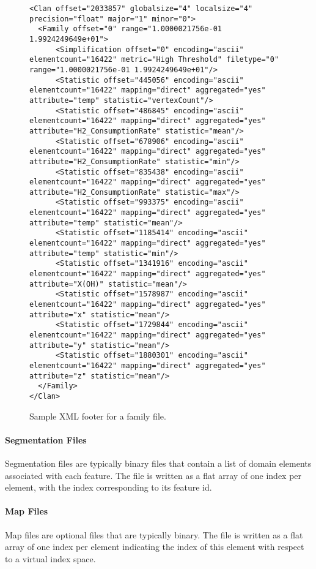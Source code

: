 \begin{figure}[ht]
\tiny{
\begin{verbatim}
<Clan offset="2033857" globalsize="4" localsize="4" precision="float" major="1" minor="0">
  <Family offset="0" range="1.0000021756e-01 1.9924249649e+01">
      <Simplification offset="0" encoding="ascii" elementcount="16422" metric="High Threshold" filetype="0" range="1.0000021756e-01 1.9924249649e+01"/>
      <Statistic offset="445056" encoding="ascii" elementcount="16422" mapping="direct" aggregated="yes" attribute="temp" statistic="vertexCount"/>
      <Statistic offset="486845" encoding="ascii" elementcount="16422" mapping="direct" aggregated="yes" attribute="H2_ConsumptionRate" statistic="mean"/>
      <Statistic offset="678906" encoding="ascii" elementcount="16422" mapping="direct" aggregated="yes" attribute="H2_ConsumptionRate" statistic="min"/>
      <Statistic offset="835438" encoding="ascii" elementcount="16422" mapping="direct" aggregated="yes" attribute="H2_ConsumptionRate" statistic="max"/>
      <Statistic offset="993375" encoding="ascii" elementcount="16422" mapping="direct" aggregated="yes" attribute="temp" statistic="mean"/>
      <Statistic offset="1185414" encoding="ascii" elementcount="16422" mapping="direct" aggregated="yes" attribute="temp" statistic="min"/>
      <Statistic offset="1341916" encoding="ascii" elementcount="16422" mapping="direct" aggregated="yes" attribute="X(OH)" statistic="mean"/>
      <Statistic offset="1578987" encoding="ascii" elementcount="16422" mapping="direct" aggregated="yes" attribute="x" statistic="mean"/>
      <Statistic offset="1729844" encoding="ascii" elementcount="16422" mapping="direct" aggregated="yes" attribute="y" statistic="mean"/>
      <Statistic offset="1880301" encoding="ascii" elementcount="16422" mapping="direct" aggregated="yes" attribute="z" statistic="mean"/>
  </Family>
</Clan>
\end{verbatim}
}
\label{fig:footer}
\caption{Sample XML footer for a family file.}
\end{figure}


\paragraph{Segmentation Files}
Segmentation files are typically binary files that contain a list of domain elements associated with each feature.  
The file is written as a flat array of one index per element, with the index corresponding to its feature id.

\paragraph{Map Files}
Map files are optional files that are typically binary. The file is written as a flat array of one index per 
element indicating the index of this element with respect to a virtual index space.

